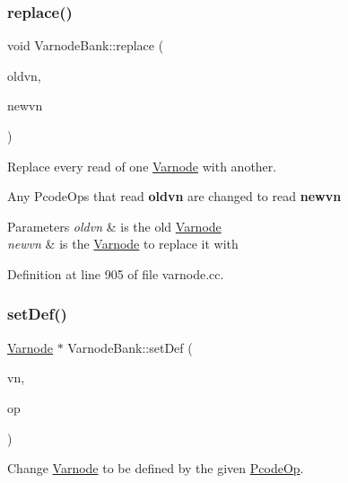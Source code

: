 \subsubsection{\texorpdfstring{replace()}{replace()}}
{\footnotesize\ttfamily void Varnode\+Bank\+::replace (\begin{DoxyParamCaption}\item[{\mbox{\hyperlink{class_varnode}{Varnode}} $\ast$}]{oldvn,  }\item[{\mbox{\hyperlink{class_varnode}{Varnode}} $\ast$}]{newvn }\end{DoxyParamCaption})}



Replace every read of one \mbox{\hyperlink{class_varnode}{Varnode}} with another. 

Any Pcode\+Ops that read {\bfseries{oldvn}} are changed to read {\bfseries{newvn}} 
\begin{DoxyParams}{Parameters}
{\em oldvn} & is the old \mbox{\hyperlink{class_varnode}{Varnode}} \\
\hline
{\em newvn} & is the \mbox{\hyperlink{class_varnode}{Varnode}} to replace it with \\
\hline
\end{DoxyParams}


Definition at line 905 of file varnode.\+cc.

\mbox{\label{class_varnode_bank_ac151db372e9299db20ad0808140877e1}} 
\subsubsection{\texorpdfstring{setDef()}{setDef()}}
{\footnotesize\ttfamily \mbox{\hyperlink{class_varnode}{Varnode}} $\ast$ Varnode\+Bank\+::set\+Def (\begin{DoxyParamCaption}\item[{\mbox{\hyperlink{class_varnode}{Varnode}} $\ast$}]{vn,  }\item[{\mbox{\hyperlink{class_pcode_op}{Pcode\+Op}} $\ast$}]{op }\end{DoxyParamCaption})}



Change \mbox{\hyperlink{class_varnode}{Varnode}} to be defined by the given \mbox{\hyperlink{class_pcode_op}{Pcode\+Op}}. 

